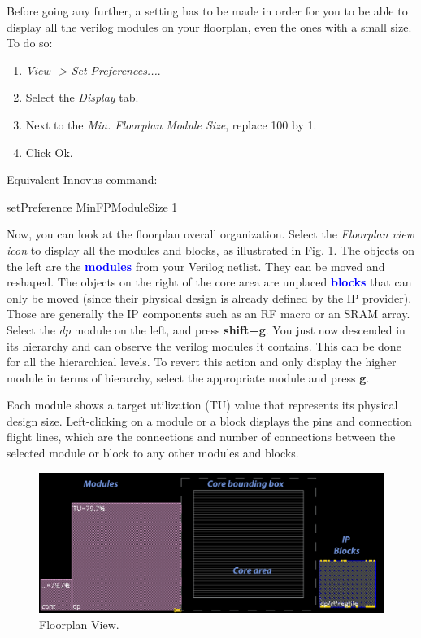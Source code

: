  Before going any further, a setting has to be made in order for you to be able to display all the verilog modules on your floorplan, even the ones with a small size. To do so:
 \begin{enumerate}
 	\item \textit{View -> Set Preferences...}.
 	\item Select the \textit{Display} tab.
 	\item Next to the \textit{Min. Floorplan Module Size}, replace 100 by 1.
 	\item Click Ok.
 \end{enumerate}
Equivalent Innovus command:
\begin{codeline}
setPreference MinFPModuleSize 1
\end{codeline}


 Now, you can look at the floorplan overall organization. Select the \textit{Floorplan view icon}  to display all the modules and blocks, as illustrated in Fig. \ref{floorplan_view}. The objects on the left are the \textcolor{blue}{\textbf{modules}} from your Verilog netlist. They can be moved and reshaped. The objects on the right of the core area are unplaced \textcolor{blue}{\textbf{blocks}} that can only be moved (since their physical design is already defined by the IP provider). Those are generally the IP components such as an RF macro or an SRAM array. Select the \textit{dp} module on the left, and press \textbf{shift+g}. You just now descended in its hierarchy and can observe the verilog modules it contains. This can be done for all the hierarchical levels. To revert this action and only display the higher module in terms of hierarchy, select the appropriate module and press \textbf{g}. \newline
 
 Each module shows a target utilization (TU) value that represents its physical design size. Left-clicking on a module or a block displays the pins and connection flight lines, which are the connections and number of connections between the selected module or block to any other modules and blocks.



	\begin{figure}[!h]
	\centering
	\includegraphics[scale=0.43]{figures/lab5_backend/floorplan_view.pdf}
	\caption{Floorplan View.}
	\label{floorplan_view}
\end{figure}

